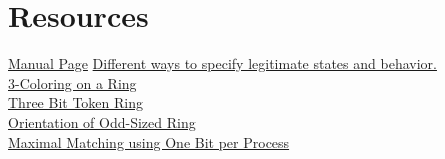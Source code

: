 
\section{Resources}
\href{man.html}{Manual Page}
\href{legit.html}{Different ways to specify legitimate states and behavior.}
\\\href{example/ColorRing.html}{3-Coloring on a Ring}
\\\href{example/TokenRingThreeBit.html}{Three Bit Token Ring}
\\\href{example/OrientOddRing.html}{Orientation of Odd-Sized Ring}
\\\href{example/MatchRingOneBit.html}{Maximal Matching using One Bit per Process}





